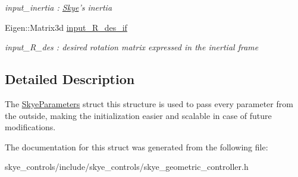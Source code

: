 \begin{DoxyCompactItemize}
\begin{DoxyCompactList}\small\item\em input\-\_\-inertia \-: \hyperlink{class_skye}{Skye}'s inertia \end{DoxyCompactList}\item 
\hypertarget{struct_skye_parameters_acc2c9df1cdc2feb5695ae3dc49c7b838}{Eigen\-::\-Matrix3d \hyperlink{struct_skye_parameters_acc2c9df1cdc2feb5695ae3dc49c7b838}{input\-\_\-\-R\-\_\-des\-\_\-if}}\label{struct_skye_parameters_acc2c9df1cdc2feb5695ae3dc49c7b838}

\begin{DoxyCompactList}\small\item\em input\-\_\-\-R\-\_\-des \-: desired rotation matrix expressed in the inertial frame \end{DoxyCompactList}\end{DoxyCompactItemize}


\subsection{Detailed Description}
The \hyperlink{struct_skye_parameters}{Skye\-Parameters} struct this structure is used to pass every parameter from the outside, making the initialization easier and scalable in case of future modifications. 

The documentation for this struct was generated from the following file\-:\begin{DoxyCompactItemize}
\item 
skye\-\_\-controls/include/skye\-\_\-controls/skye\-\_\-geometric\-\_\-controller.\-h\end{DoxyCompactItemize}
